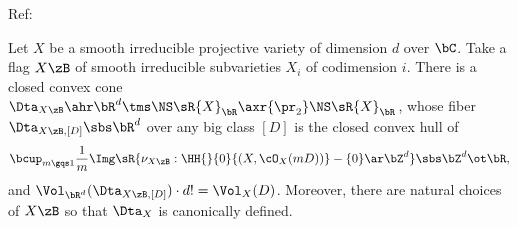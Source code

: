 \documentclass[article, a4paper, twoside]{universal}
\begin{document}
\confighead{}{}{}


Ref:~\cite{LM2009Convex}


\begin{thm}
    Let $X$ be a smooth irreducible projective variety of dimension $d$ over $\bC$. Take a flag $X\zB$ of smooth irreducible subvarieties $X_{i}$ of codimension $i$. There is a closed convex cone $\Dta_{X\zB}\ahr\bR^{d}\tms\NS\sR{X}_{\bR}\axr{\pr_{2}}\NS\sR{X}_{\bR}$, whose fiber $\Dta_{X\zB,[D]}\sbs\bR^{d}$ over any big class $[D]$ is the closed convex hull of
    \[
        \bcup_{m\gqs1}\frac{1}{m}\Img\sR{\nu_{X\zB}:\HH{}{0}{(X,\cO_{X}(mD))}-\{0\}\ar\bZ^{d}}\sbs\bZ^{d}\ot\bR,
    \]
    and $\Vol_{\bR^{d}}(\Dta_{X\zB,[D]})\cdot d!=\Vol_{X}(D)$. Moreover, there are natural choices of $X\zB$ so that $\Dta_{X}$ is canonically defined.
\end{thm}


\printref
\end{document}
